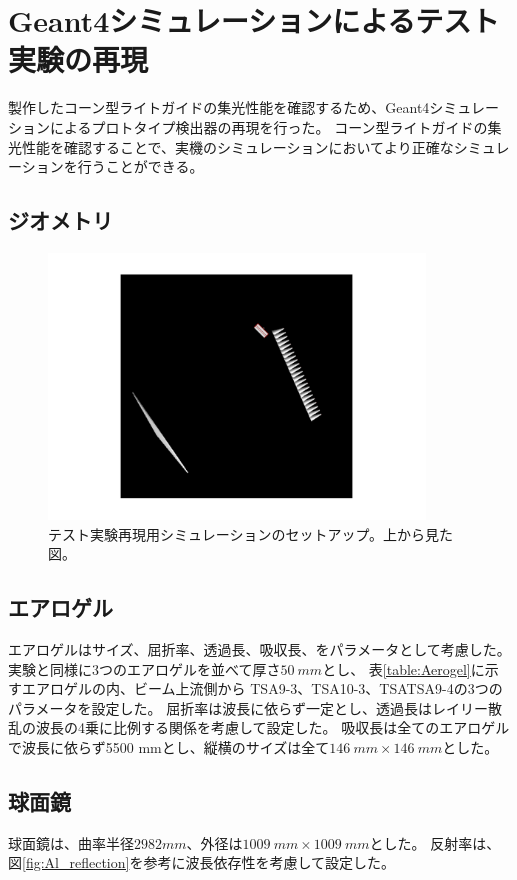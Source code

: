 \section{Geant4シミュレーションによるテスト実験の再現}
製作したコーン型ライトガイドの集光性能を確認するため、Geant4シミュレーションによるプロトタイプ検出器の再現を行った。
コーン型ライトガイドの集光性能を確認することで、実機のシミュレーションにおいてより正確なシミュレーションを行うことができる。

\subsection{ジオメトリ}

\begin{figure}[htbp]
  \centering
  \includegraphics[width=10cm, page=1]{images/chapter4/ELPHsimulationSetup.pdf}
  \caption{テスト実験再現用シミュレーションのセットアップ。上から見た図。}
  \label{fig:ELPHsimulationSetup1}
\end{figure}

\subsection{エアロゲル}
エアロゲルはサイズ、屈折率、透過長、吸収長、をパラメータとして考慮した。
実験と同様に3つのエアロゲルを並べて厚さ$\SI{50}{mm}$とし、
表\ref{table:Aerogel}に示すエアロゲルの内、ビーム上流側から
TSA9-3、TSA10-3、TSATSA9-4の3つのパラメータを設定した。
屈折率は波長に依らず一定とし、透過長はレイリー散乱の波長の4乗に比例する関係を考慮して設定した。
吸収長は全てのエアロゲルで波長に依らず5500 mmとし、縦横のサイズは全て$\SI{146}{mm}\times\SI{146}{mm}$とした。

\subsection{球面鏡}
球面鏡は、曲率半径$2982 \si{mm}$、外径は$\SI{1009}{mm}\times\SI{1009}{mm}$とした。
反射率は、図\ref{fig:Al_reflection}を参考に波長依存性を考慮して設定した。

